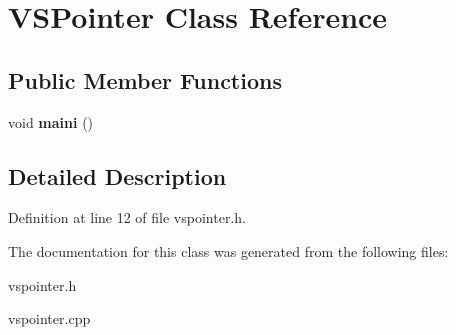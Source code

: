 \hypertarget{class_v_s_pointer}{}\section{V\+S\+Pointer Class Reference}
\label{class_v_s_pointer}
\subsection*{Public Member Functions}
\begin{DoxyCompactItemize}
\item 
\mbox{\label{class_v_s_pointer_a6da2819950e230922c593f3189c0f319}} 
void {\bfseries maini} ()
\end{DoxyCompactItemize}


\subsection{Detailed Description}


Definition at line 12 of file vspointer.\+h.



The documentation for this class was generated from the following files\+:\begin{DoxyCompactItemize}
\item 
vspointer.\+h\item 
vspointer.\+cpp\end{DoxyCompactItemize}
